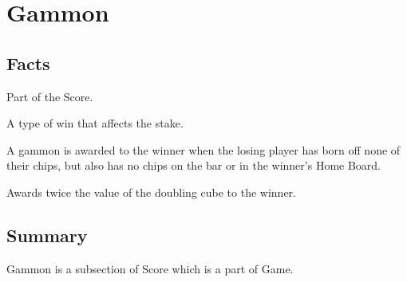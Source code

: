 
\section{Gammon}

\subsection{Facts}
\begin{dashed}
    \item Part of the Score.
    \item A type of win that affects the stake.
    \item A gammon is awarded to the winner when the losing player has born off none of their chips, but also has no chips on the bar or in the winner's Home Board.
    \item Awards twice the value of the doubling cube to the winner.
\end{dashed}


\subsection{Summary}
Gammon is a subsection of Score which is a part of Game.
